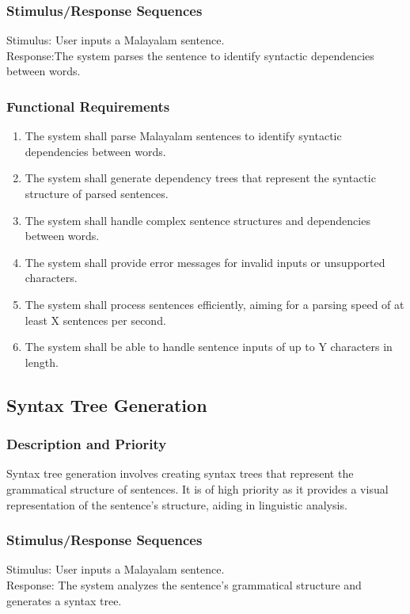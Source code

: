 \documentclass[12pt]{article}
\begin{document}
	\subsubsection{Stimulus/Response Sequences}
	Stimulus: User inputs a Malayalam sentence.\\
	Response:The system parses the sentence to identify syntactic dependencies between
	words.
	
	\subsubsection{Functional Requirements}
	\begin{enumerate}
		\item The system shall parse Malayalam sentences to identify syntactic dependencies
		between words.
		\item The system shall generate dependency trees that represent the syntactic structure
		of parsed sentences.
		\item The system shall handle complex sentence structures and dependencies between
		words.
		\item The system shall provide error messages for invalid inputs or unsupported
		characters.
		\item The system shall process sentences efficiently, aiming for a parsing speed of at
		least X sentences per second.
		\item The system shall be able to handle sentence inputs of up to Y characters in length.
	\end{enumerate}

	\subsection{Syntax Tree Generation}
	
	\subsubsection{Description and Priority}
	Syntax tree generation involves creating syntax trees that represent the grammatical
	structure of sentences. It is of high priority as it provides a visual representation of the
	sentence's structure, aiding in linguistic analysis.
	
	\subsubsection{Stimulus/Response Sequences}
	Stimulus: User inputs a Malayalam sentence.\\
	Response: The system analyzes the sentence's grammatical structure and generates a
	syntax tree.
	
\end{document}

